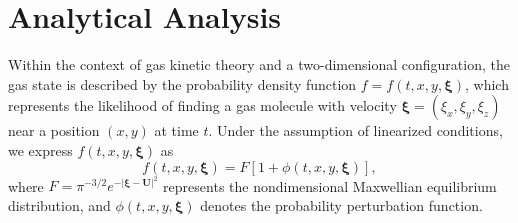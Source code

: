 \section{Analytical Analysis}
Within the context of gas kinetic theory and a two-dimensional configuration, the gas state is described by the probability density function $f=f\left(t,x,y,\boldsymbol{\xi}\right)$, which represents the likelihood of finding a gas molecule with velocity $\boldsymbol{\xi}=\left(\xi_x,\xi_y,\xi_z\right)$ near a position $\left(x,y\right)$ at time $t$. Under the assumption of linearized conditions, we express $f(t,x,y,\boldsymbol{\xi})$ as
\begin{equation} \label{eq:perturbed_Maxwell}
    f\left(t,x,y,\boldsymbol{\xi}\right)
    =
    F\left[1+\phi\left(t,x,y,\boldsymbol{\xi}\right)\right],
\end{equation}
where $F=\pi^{-3/2}e^{-\left|\boldsymbol{\xi}-\mathbf{U}\right|^2}$ represents the nondimensional Maxwellian equilibrium distribution, and $\phi\left(t,x,y,\boldsymbol{\xi}\right)$ denotes the probability perturbation function.


